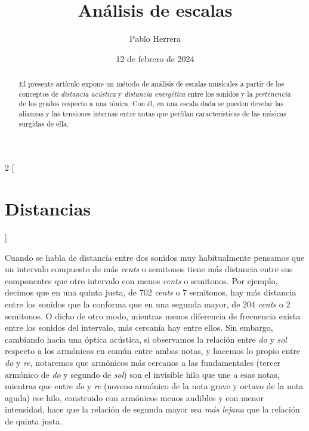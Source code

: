 \documentclass[a4paper,10pt]{article}
\begin{document}
\title{Análisis de escalas}
\author{Pablo Herrera}
\date{12 de febrero de 2024}
\maketitle
\begin{abstract}
El presente artículo expone un método de análisis de escalas musicales a partir de los conceptos de \emph{distancia acústica} y \emph{distancia energética} entre los sonidos y la \emph{pertenencia} de los grados respecto a una tónica. Con él, en una escala dada se pueden develar las alianzas y las tensiones internas entre notas que perfilan características de las músicas surgidas de ella.
\end{abstract}
\tableofcontents
\newpage
\begin{multicols}{2}
[\section{Distancias}\label{sec:distancias}]

  Cuando se habla de distancia entre dos sonidos muy habitualmente pensamos que un intervalo compuesto de más \emph{cents} o semitonos tiene más distancia entre sus componentes que otro intervalo con menos \emph{cents} o semitonos. Por ejemplo, decimos que en una quinta justa, de 702 \emph{cents} o 7 semitonos, hay más distancia entre los sonidos que la conforma que en una segunda mayor, de 204 \emph{cents} o 2 semitonos. O dicho de otro modo, mientras menos diferencia de frecuencia exista entre los sonidos del intervalo, más cercanía hay entre ellos. Sin embargo, cambiando hacia una óptica acústica, si observamos la relación entre \emph{do} y \emph{sol} respecto a los armónicos en común entre ambas notas, y hacemos lo propio entre \emph{do} y \emph{re}, notaremos que armónicos más cercanos a las fundamentales (tercer armónico de \emph{do} y segundo de \emph{sol}) son el invisible hilo que une a esas notas, mientras que entre \emph{do} y \emph{re} (noveno armónico de la nota grave y octavo de la nota aguda) ese hilo, construido con armónicos menos audibles y con menor intensidad, hace que la relación de segunda mayor sea \emph{más lejana} que la relación de quinta justa.


\end{multicols}
\end{document}
